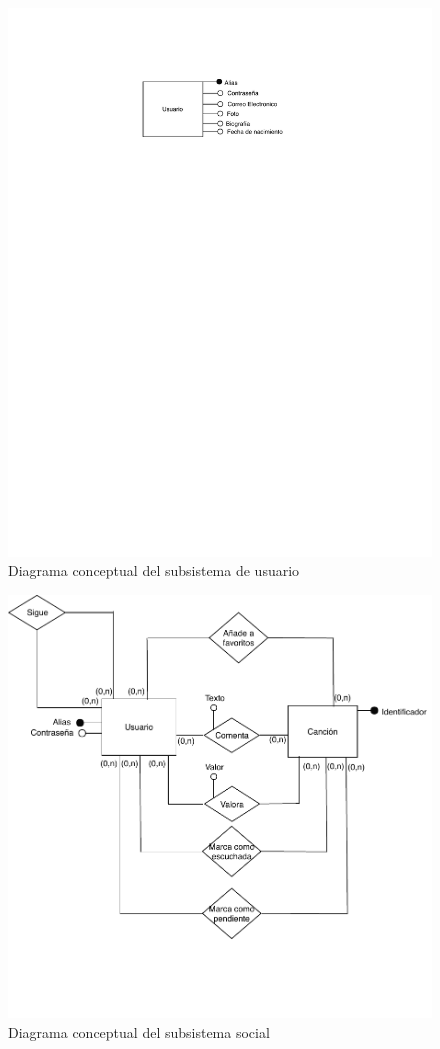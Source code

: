 \begin{figure}[H]
  \caption{Diagrama conceptual del subsistema de usuario}
  \centering
  \includegraphics{diagramas/conceptual-usuario.pdf}
\end{figure}

\begin{figure}[H]
  \caption{Diagrama conceptual del subsistema social}
  \centering
  \includegraphics{diagramas/conceptual-social.pdf}
\end{figure}


